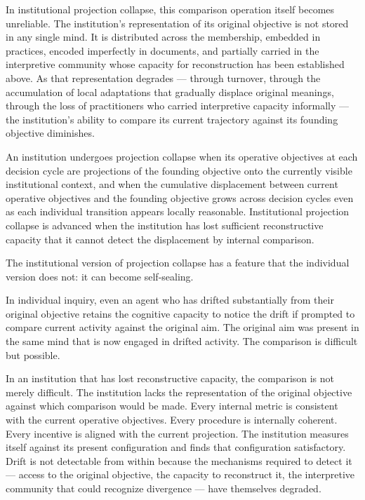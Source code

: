 In institutional projection collapse, this comparison operation itself becomes
unreliable. The institution's representation of its original objective is not
stored in any single mind. It is distributed across the membership, embedded
in practices, encoded imperfectly in documents, and partially carried in the
interpretive community whose capacity for reconstruction has been established
above. As that representation degrades --- through turnover, through the
accumulation of local adaptations that gradually displace original meanings,
through the loss of practitioners who carried interpretive capacity informally
--- the institution's ability to compare its current trajectory against its
founding objective diminishes.

\begin{defn}
An institution undergoes projection collapse when its operative objectives
at each decision cycle are projections of the founding objective onto the
currently visible institutional context, and when the cumulative displacement
between current operative objectives and the founding objective grows across
decision cycles even as each individual transition appears locally reasonable.
Institutional projection collapse is advanced when the institution has lost
sufficient reconstructive capacity that it cannot detect the displacement
by internal comparison.
\end{defn}

The institutional version of projection collapse has a feature that the
individual version does not: it can become self-sealing.

In individual inquiry, even an agent who has drifted substantially from their
original objective retains the cognitive capacity to notice the drift if
prompted to compare current activity against the original aim. The original
aim was present in the same mind that is now engaged in drifted activity.
The comparison is difficult but possible.

In an institution that has lost reconstructive capacity, the comparison is
not merely difficult. The institution lacks the representation of the original
objective against which comparison would be made. Every internal metric
is consistent with the current operative objectives. Every procedure is
internally coherent. Every incentive is aligned with the current projection.
The institution measures itself against its present configuration and finds
that configuration satisfactory. Drift is not detectable from within because
the mechanisms required to detect it --- access to the original objective,
the capacity to reconstruct it, the interpretive community that could
recognize divergence --- have themselves degraded.

